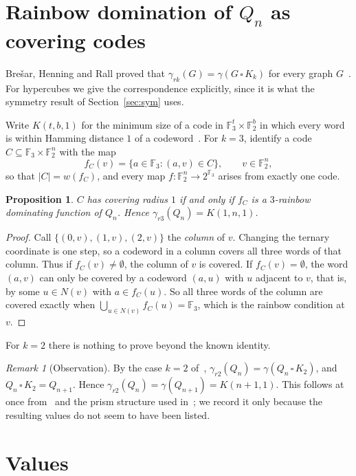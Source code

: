 \documentclass[11pt]{article}
\newtheorem{proposition}[theorem]{Proposition}
\theoremstyle{definition}
\theoremstyle{remark}
\newtheorem{remark}[theorem]{Remark}
\newcommand{\F}{\mathbb{F}}
\begin{document}
\section{Rainbow domination of $Q_n$ as covering codes}

Brešar, Henning and Rall proved that $\gamma_{rk}(G)=\gamma(G\,\square\,K_k)$ for every graph
$G$~\cite{bhr}. For hypercubes we give the correspondence explicitly, since it is what the
symmetry result of Section~\ref{sec:sym} uses.

Write $K(t,b,1)$ for the minimum size of a code in $\F_3^t\times\F_2^b$ in which every word is
within Hamming distance $1$ of a codeword~\cite{bow,oh}. For $k=3$, identify a code
$C\subseteq\F_3\times\F_2^n$ with the map
\[
f_C(v)=\{a\in\F_3 : (a,v)\in C\},\qquad v\in\F_2^n,
\]
so that $|C|=w(f_C)$, and every map $f\colon\F_2^n\to 2^{\F_3}$ arises from exactly one code.

\begin{proposition}\label{prop:bridge}
$C$ has covering radius $1$ if and only if $f_C$ is a $3$-rainbow dominating function of $Q_n$.
Hence $\gamma_{r3}(Q_n)=K(1,n,1)$.
\end{proposition}

\begin{proof}
Call $\{(0,v),(1,v),(2,v)\}$ the \emph{column} of $v$. Changing the ternary coordinate is one
step, so a codeword in a column covers all three words of that column. Thus if
$f_C(v)\neq\emptyset$, the column of $v$ is covered. If $f_C(v)=\emptyset$, the word $(a,v)$ can
only be covered by a codeword $(a,u)$ with $u$ adjacent to $v$, that is, by some $u\in N(v)$ with
$a\in f_C(u)$. So all three words of the column are covered exactly when
$\bigcup_{u\in N(v)}f_C(u)=\F_3$, which is the rainbow condition at $v$.
\end{proof}

For $k=2$ there is nothing to prove beyond the known identity.

\begin{remark}[Observation]
By the case $k=2$ of~\cite{bhr}, $\gamma_{r2}(Q_n)=\gamma(Q_n\,\square\,K_2)$, and
$Q_n\,\square\,K_2=Q_{n+1}$. Hence $\gamma_{r2}(Q_n)=\gamma(Q_{n+1})=K(n+1,1)$. This follows at
once from~\cite{bhr} and the prism structure used in~\cite{ahk}; we record it only because the
resulting values do not seem to have been listed.
\end{remark}

\section{Values}
\end{document}
